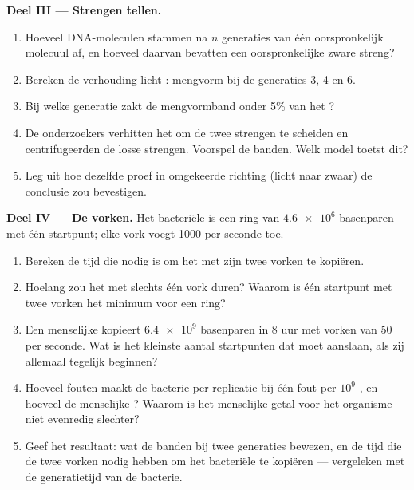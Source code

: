\begin{problem}
\medskip
\noindent\textbf{Deel III --- Strengen tellen.}
\begin{enumerate}[resume]
  \item Hoeveel DNA-moleculen stammen na $n$ generaties van één
        oorspronkelijk molecuul af, en hoeveel daarvan bevatten een
        oorspronkelijke zware streng?
  \item Bereken de verhouding licht : mengvorm bij de generaties 3, 4 en
        6.
  \item Bij welke generatie zakt de mengvormband onder 5\% van het ?
  \item De onderzoekers verhitten het  om de twee strengen te
        scheiden en centrifugeerden de losse strengen. Voorspel de banden.
        Welk model toetst dit?
  \item Leg uit hoe dezelfde proef in omgekeerde richting (licht naar
        zwaar) de conclusie zou bevestigen.
\end{enumerate}

\medskip
\noindent\textbf{Deel IV --- De vorken.}
Het bacteriële  is een ring van $\num{4.6e6}$ basenparen met
één startpunt; elke vork voegt 1000  per seconde toe.
\begin{enumerate}[resume]
  \item Bereken de tijd die nodig is om het  met zijn twee
        vorken te kopiëren.
  \item Hoelang zou het met slechts één vork duren? Waarom is één
        startpunt met twee vorken het minimum voor een ring?
  \item Een menselijke  kopieert $\num{6.4e9}$ basenparen in 8 uur met
        vorken van 50  per seconde. Wat is het kleinste aantal
        startpunten dat moet aanslaan, als zij allemaal tegelijk
        beginnen?
  \item Hoeveel fouten maakt de bacterie per replicatie bij één fout per
        $10^9$ , en hoeveel de menselijke ? Waarom is het
        menselijke getal voor het organisme niet evenredig slechter?
  \item Geef het resultaat: wat de banden bij twee generaties bewezen, en
        de tijd die de twee vorken nodig hebben om het bacteriële
         te kopiëren --- vergeleken met de generatietijd van de
        bacterie.
\end{enumerate}
\end{problem}
